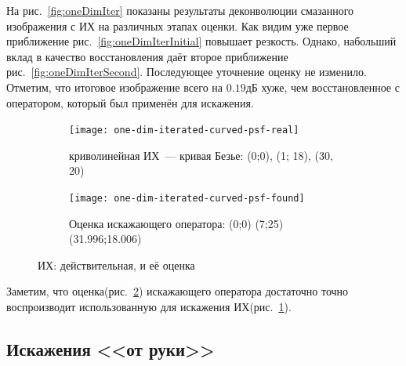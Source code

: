 На рис.~\ref{fig:oneDimIter} показаны результаты деконволюции смазанного изображения с ИХ на различных этапах оценки. Как видим уже первое приближение рис.~\ref{fig:oneDimIterInitial} повышает резкость. Однако, набольший вклад в качество восстановления даёт второе приближение рис.~\ref{fig:oneDimIterSecond}. Последующее уточнение оценку не изменило. Отметим, что итоговое изображение всего на $0.19$дБ хуже, чем восстановленное с оператором, который был применён для искажения.

\begin{figure}[h!]
	\centering
	\begin{subfigure}[t]{0.475\textwidth}
		\centering
		\texttt{[image: one-dim-iterated-curved-psf-real]}
		\caption{криволинейная ИХ~--- кривая Безье: (0;0), (1; 18), (30, 20)}
		\label{fig:oneDimIterPsfTrue}
	\end{subfigure}
	\hfill
	\begin{subfigure}[t]{0.475\textwidth}
		\centering
		\texttt{[image: one-dim-iterated-curved-psf-found]}
		\caption{Оценка искажающего оператора: (0;0) (7;25) (31.996;18.006)}
		\label{fig:oneDimIterPsfFound}
	\end{subfigure}
	\caption{ИХ: действительная, и её оценка}
	\label{fig:oneDimIterPsf}
\end{figure}

Заметим, что оценка(рис.~\ref{fig:oneDimIterPsfFound}) искажающего оператора достаточно точно воспроизводит использованную для искажения ИХ(рис.~\ref{fig:oneDimIterPsfTrue}).

\subsection{Искажения <<от руки>>}

